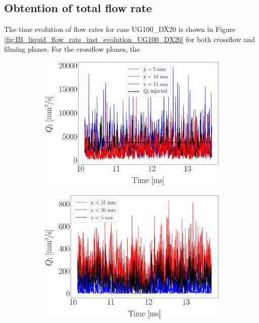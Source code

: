 \subsection{Obtention of total flow rate}

The time evolution of flow rates for case UG100\_DX20 is shown in Figure \ref{fig:IB_liquid_flow_rate_inst_evolution_UG100_DX20} for both crossflow and filming planes. For the crossflow planes, the 


\begin{figure}[ht]
\centering
\begin{subfigure}[b]{0.45\textwidth}
	\centering
   \includegraphics[scale=0.15]{./part2_developments/figures_ch5_resolved_JICF/flow_rates_ibs/uG100_dx20_QL_isox_time_evol.eps}
\end{subfigure}
\begin{subfigure}[b]{0.45\textwidth}
	\centering
   \includegraphics[scale=0.15]{./part2_developments/figures_ch5_resolved_JICF/flow_rates_ibs/uG100_dx20_QL_filming_time_evol.eps}

\end{subfigure}
\end{figure}
